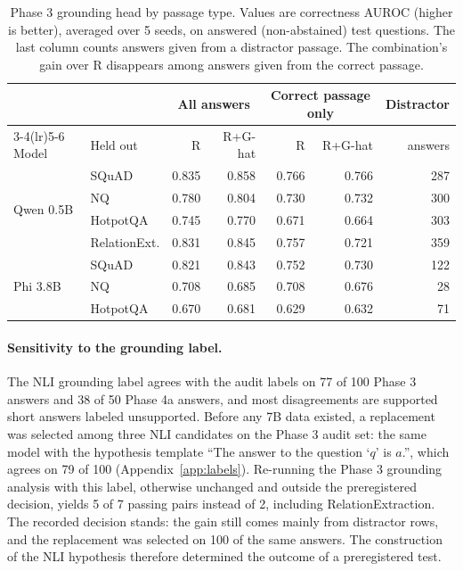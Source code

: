 \documentclass[10pt]{article}
\begin{document}
\begin{table}[t]
\centering
\small
\begin{tabular}{@{}llrrrrr@{}}
\toprule
 & & \multicolumn{2}{c}{All answers} & \multicolumn{2}{c}{Correct passage only} & Distractor \\
\cmidrule(lr){3-4}\cmidrule(lr){5-6}
Model & Held out & R & R+G-hat & R & R+G-hat & answers \\
\midrule
\multirow{4}{*}{Qwen 0.5B} & SQuAD & 0.835 & 0.858 & 0.766 & 0.766 & 287 \\
 & NQ & 0.780 & 0.804 & 0.730 & 0.732 & 300 \\
 & HotpotQA & 0.745 & 0.770 & 0.671 & 0.664 & 303 \\
 & RelationExt. & 0.831 & 0.845 & 0.757 & 0.721 & 359 \\
\midrule
\multirow{3}{*}{Phi 3.8B} & SQuAD & 0.821 & 0.843 & 0.752 & 0.730 & 122 \\
 & NQ & 0.708 & 0.685 & 0.708 & 0.676 & 28 \\
 & HotpotQA & 0.670 & 0.681 & 0.629 & 0.632 & 71 \\
\bottomrule
\end{tabular}
\caption{Phase 3 grounding head by passage type. Values are correctness AUROC (higher is better), averaged over 5 seeds, on answered (non-abstained) test questions. The last column counts answers given from a distractor passage. The combination's gain over R disappears among answers given from the correct passage.}
\label{tab:passage}
\end{table}

\paragraph{Sensitivity to the grounding label.} The NLI grounding label agrees with the audit labels on 77 of 100 Phase 3 answers and 38 of 50 Phase 4a answers, and most disagreements are supported short answers labeled unsupported. Before any 7B data existed, a replacement was selected among three NLI candidates on the Phase 3 audit set: the same model with the hypothesis template ``The answer to the question `$q$' is $a$.'', which agrees on 79 of 100 (Appendix~\ref{app:labels}). Re-running the Phase 3 grounding analysis with this label, otherwise unchanged and outside the preregistered decision, yields 5 of 7 passing pairs instead of 2, including RelationExtraction. The recorded decision stands: the gain still comes mainly from distractor rows, and the replacement was selected on 100 of the same answers. The construction of the NLI hypothesis therefore determined the outcome of a preregistered test.
\end{document}
